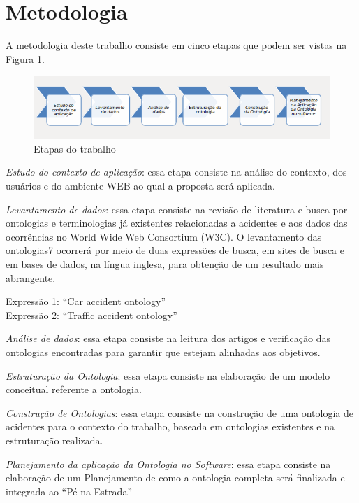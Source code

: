 \section{Metodologia}

A metodologia deste trabalho consiste em cinco etapas que podem ser vistas na
Figura \ref{fig:metodologia}.

\graphicspath{{figuras/}}

\begin{figure}[!h]
 \centering
 \includegraphics[scale = 0.75]{metodologia}
 \caption{Etapas do trabalho}
 \label{fig:metodologia}

\end{figure}
\textit{Estudo do contexto de aplicação}: essa etapa consiste na análise do contexto, dos
usuários e do ambiente WEB ao qual a proposta será aplicada.

\textit{Levantamento de dados}: essa etapa consiste na revisão de literatura e busca por
ontologias e terminologias já existentes relacionadas a acidentes e aos dados das
ocorrências no World Wide Web Consortium (W3C). O levantamento das ontologias7
ocorrerá por meio de duas expressões de busca, em sites de busca e em bases de dados, na
língua inglesa, para obtenção de um resultado mais abrangente.

\begin{center}
  Expressão 1: “Car accident ontology”\\
  Expressão 2: “Traffic accident ontology”
\end{center}


\textit{Análise de dados}: essa etapa consiste na leitura dos artigos e verificação das
ontologias encontradas para garantir que estejam alinhadas aos objetivos.

\textit{Estruturação da Ontologia}: essa etapa consiste na elaboração de um modelo conceitual
referente a ontologia.

\textit{Construção de Ontologias}: essa etapa consiste na construção de uma ontologia de
acidentes para o contexto do trabalho, baseada em ontologias existentes e na estruturação realizada.

\textit{Planejamento da aplicação da Ontologia no Software}: essa etapa consiste na elaboração de um Planejamento
de como a ontologia completa será finalizada e integrada ao ``Pé na Estrada''